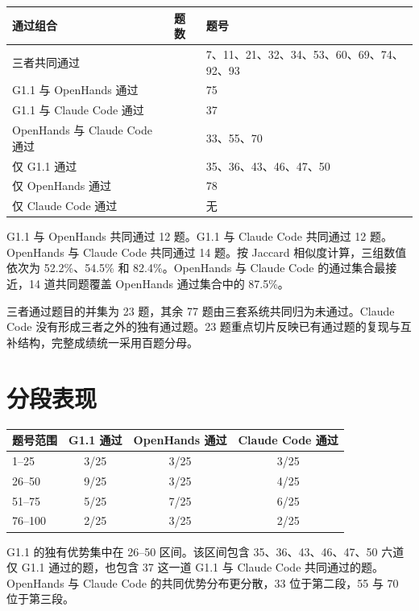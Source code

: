 \documentclass[11pt,a4paper,fontset=fandol]{ctexart}
\begin{document}
\begin{center}
\begin{tabularx}{0.98\textwidth}{>{\raggedright\arraybackslash}p{4.2cm}>{\centering\arraybackslash}p{1.4cm}X}
\toprule
通过组合 & 题数 & 题号 \\
\midrule
三者共同通过 & 11 & 7、11、21、32、34、53、60、69、74、92、93 \\
G1.1 与 OpenHands 通过 & 1 & 75 \\
G1.1 与 Claude Code 通过 & 1 & 37 \\
OpenHands 与 Claude Code 通过 & 3 & 33、55、70 \\
仅 G1.1 通过 & 6 & 35、36、43、46、47、50 \\
仅 OpenHands 通过 & 1 & 78 \\
仅 Claude Code 通过 & 0 & 无 \\
\bottomrule
\end{tabularx}
\end{center}

G1.1 与 OpenHands 共同通过 12 题。G1.1 与 Claude Code 共同通过 12 题。OpenHands 与 Claude Code 共同通过 14 题。按 Jaccard 相似度计算，三组数值依次为 52.2\%、54.5\% 和 82.4\%。OpenHands 与 Claude Code 的通过集合最接近，14 道共同题覆盖 OpenHands 通过集合中的 87.5\%。

三者通过题目的并集为 23 题，其余 77 题由三套系统共同归为未通过。Claude Code 没有形成三者之外的独有通过题。23 题重点切片反映已有通过题的复现与互补结构，完整成绩统一采用百题分母。

\section{分段表现}

\begin{center}
\begin{tabular}{lccc}
\toprule
题号范围 & G1.1 通过 & OpenHands 通过 & Claude Code 通过 \\
\midrule
1--25 & 3/25 & 3/25 & 3/25 \\
26--50 & 9/25 & 3/25 & 4/25 \\
51--75 & 5/25 & 7/25 & 6/25 \\
76--100 & 2/25 & 3/25 & 2/25 \\
\bottomrule
\end{tabular}
\end{center}

G1.1 的独有优势集中在 26--50 区间。该区间包含 35、36、43、46、47、50 六道仅 G1.1 通过的题，也包含 37 这一道 G1.1 与 Claude Code 共同通过的题。OpenHands 与 Claude Code 的共同优势分布更分散，33 位于第二段，55 与 70 位于第三段。
\end{document}
